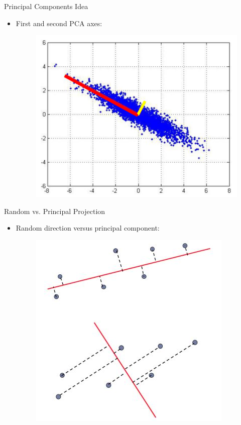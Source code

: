 \documentclass[serif, aspectratio=169]{beamer}
\begin{document}
\begin{frame}{Principal Components Idea}
    \begin{itemize}
        \item First and second PCA axes:
         \begin{figure}[htpb]
            \begin{center}
                \includegraphics[keepaspectratio, scale=1]{pic/pcaData2.JPG}
            \end{center}
        \end{figure}
    \end{itemize}
\end{frame}

\begin{frame}{Random vs. Principal Projection}
    \begin{itemize}
        \item Random direction versus principal component:
        \begin{figure}[htpb]
            \begin{center}
                \includegraphics[keepaspectratio, scale=0.8]{pic/pcaVSrandom.JPG}
            \end{center}
        \end{figure}
    \end{itemize}
\end{frame}
\end{document}
